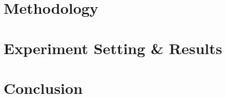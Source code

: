 \documentclass[sigconf,anonymous,review]{acmart}
\begin{document}
% 

\section{Methodology}


\section{Experiment Setting \& Results}


\section{Conclusion}


\balance


\end{document}

